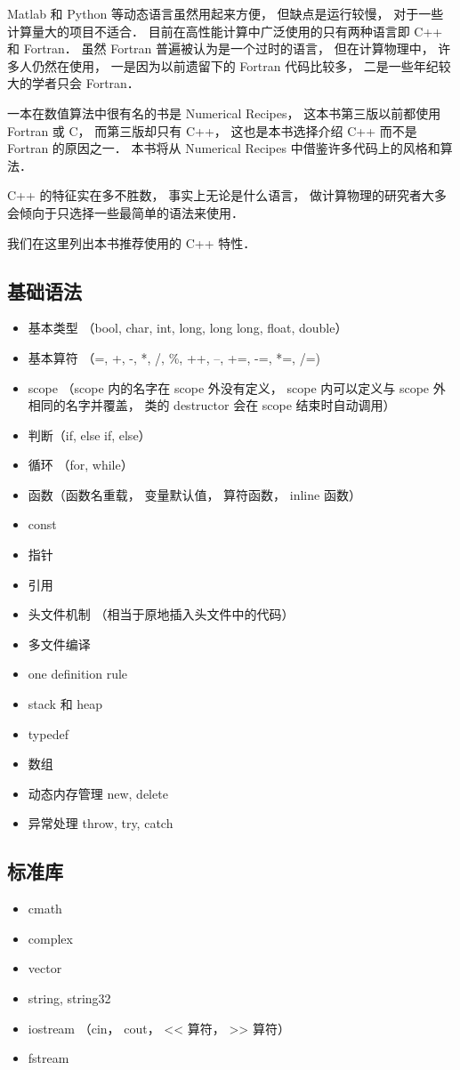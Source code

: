 
Matlab 和 Python 等动态语言虽然用起来方便， 但缺点是运行较慢， 对于一些计算量大的项目不适合． 目前在高性能计算中广泛使用的只有两种语言即 C++ 和 Fortran． 虽然 Fortran 普遍被认为是一个过时的语言， 但在计算物理中， 许多人仍然在使用， 一是因为以前遗留下的 Fortran 代码比较多， 二是一些年纪较大的学者只会 Fortran．

一本在数值算法中很有名的书是 Numerical Recipes， 这本书第三版以前都使用 Fortran 或 C， 而第三版却只有 C++， 这也是本书选择介绍 C++ 而不是 Fortran 的原因之一． 本书将从 Numerical Recipes 中借鉴许多代码上的风格和算法．

C++ 的特征实在多不胜数， 事实上无论是什么语言， 做计算物理的研究者大多会倾向于只选择一些最简单的语法来使用．

我们在这里列出本书推荐使用的 C++ 特性．

\subsection{基础语法}
\begin{itemize}
\item 基本类型 （bool, char, int, long, long long, float, double）
\item 基本算符 （=, +, -, *, /, \%, ++, --, +=, -=, *=, /=)
\item scope （scope 内的名字在 scope 外没有定义， scope 内可以定义与 scope 外相同的名字并覆盖， 类的 destructor 会在 scope 结束时自动调用）
\item 判断（if, else if, else）
\item 循环 （for, while）
\item 函数（函数名重载， 变量默认值， 算符函数， inline 函数）
\item const
\item 指针
\item 引用
\item 头文件机制 （相当于原地插入头文件中的代码）
\item 多文件编译
\item one definition rule
\item stack 和 heap
\item typedef
\item 数组
\item 动态内存管理 new, delete
\item 异常处理 throw, try, catch
\end{itemize}

\subsection{标准库}
\begin{itemize}
\item cmath
\item complex
\item vector
\item string, string32
\item iostream （cin， cout， << 算符， >> 算符）
\item fstream
\end{itemize}


